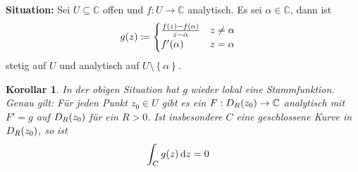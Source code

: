 \documentclass[11pt, a4paper]{article}
\theoremstyle{plain}
\newtheorem{korollar}[blockelement]{Korollar}
\numberwithin{equation}{subsection}
\newcommand{\set}[1]{\left\{#1\right\}}
\newcommand{\of}[1]{\mathopen{}\mathclose{}\bgroup\left(#1\aftergroup\egroup\right)}
\newcommand{\dif}{\mathop{}\!\mathrm{d}}
\newcommand{\C}{\mathbb{C}}
\begin{document}
    \thispagestyle{sectionpage}

    \marginnote{[12. Mai]}
    \textbf{Situation:} Sei $U\subseteq\C$ offen und $f: U \to \C$ analytisch. Es sei $\alpha\in\C$, dann ist
    \begin{align*}
        g\of{z} &\coloneqq \begin{cases}
                               \frac{f\of{z} - f\of{\alpha}}{z-\alpha} &z\neq \alpha\\
                               f'\of{\alpha} &z=\alpha
        \end{cases}
    \end{align*}
    stetig auf $U$ und analytisch auf $U\setminus\set{\alpha}$.

    \begin{korollar}
        \label{kor:stammfunktion}
        In der obigen Situation hat $g$ wieder lokal eine Stammfunktion. Genau gilt: Für jeden Punkt $z_0\in U$ gibt es ein $F: D_R\of{z_0} \to \C$ analytisch mit $F' = g$ auf $D_R\of{z_0}$ für ein $R > 0$. Ist insbesondere $C$ eine geschlossene Kurve in $D_R\of{z_0}$, so ist
        \begin{align*}
            \int_{C}^{} g\of{z} \dif z &= 0
        \end{align*}
    \end{korollar}
\end{document}
